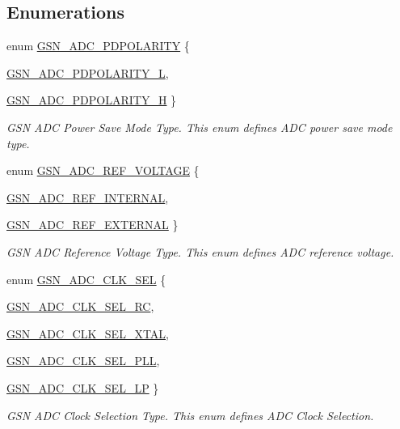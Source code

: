 \subsection*{Enumerations}
\begin{DoxyCompactItemize}
\item 
enum \hyperlink{a00643_ga16deea942d0f1d07a971516149233bb4}{GSN\_\-ADC\_\-PDPOLARITY} \{ \par
\hyperlink{a00643_gga16deea942d0f1d07a971516149233bb4a4c93f28c10b8dac170fba58a41df9699}{GSN\_\-ADC\_\-PDPOLARITY\_\-L}, 
\par
\hyperlink{a00643_gga16deea942d0f1d07a971516149233bb4a4b2e65383baf79d5342d80ad2deeb622}{GSN\_\-ADC\_\-PDPOLARITY\_\-H}
 \}
\begin{DoxyCompactList}\small\item\em GSN ADC Power Save Mode Type. This enum defines ADC power save mode type. \end{DoxyCompactList}\item 
enum \hyperlink{a00643_ga8371c67f612ecadda1e42fa07f34a967}{GSN\_\-ADC\_\-REF\_\-VOLTAGE} \{ \par
\hyperlink{a00643_gga8371c67f612ecadda1e42fa07f34a967a1b5fc32b474b38286caf602cad737ed3}{GSN\_\-ADC\_\-REF\_\-INTERNAL}, 
\par
\hyperlink{a00643_gga8371c67f612ecadda1e42fa07f34a967a096151b970157e924b648e02bac39dbc}{GSN\_\-ADC\_\-REF\_\-EXTERNAL}
 \}
\begin{DoxyCompactList}\small\item\em GSN ADC Reference Voltage Type. This enum defines ADC reference voltage. \end{DoxyCompactList}\item 
enum \hyperlink{a00643_ga2f2a2e534be6515e903852c38803c75f}{GSN\_\-ADC\_\-CLK\_\-SEL} \{ \par
\hyperlink{a00643_gga2f2a2e534be6515e903852c38803c75fa85f23e9c8ebcb6440fde408550d8b740}{GSN\_\-ADC\_\-CLK\_\-SEL\_\-RC}, 
\par
\hyperlink{a00643_gga2f2a2e534be6515e903852c38803c75fa0e0217d2862f545db0a2a03f9f495805}{GSN\_\-ADC\_\-CLK\_\-SEL\_\-XTAL}, 
\par
\hyperlink{a00643_gga2f2a2e534be6515e903852c38803c75facdcf3e29cb98a2bb7378bff0c6b240d5}{GSN\_\-ADC\_\-CLK\_\-SEL\_\-PLL}, 
\par
\hyperlink{a00643_gga2f2a2e534be6515e903852c38803c75fa8e772ffe7936534a384abd3153507b79}{GSN\_\-ADC\_\-CLK\_\-SEL\_\-LP}
 \}
\begin{DoxyCompactList}\small\item\em GSN ADC Clock Selection Type. This enum defines ADC Clock Selection. \end{DoxyCompactList}\item 

\end{DoxyCompactItemize}
